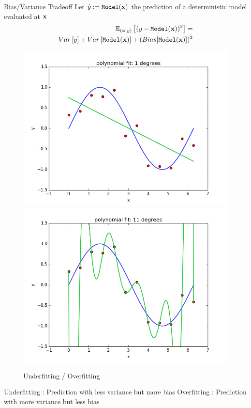 \documentclass[xcolor=pdftex,dvipsnames,table,mathserif]{beamer}
\begin{document}
\begin{frame}{Bias/Variance Tradeoff}
Let $\hat{y}:=\texttt{Model}(\mathbf{x})$ the prediction of a deterministic model evaluated at $\mathbf{x}$
\begin{eqnarray*}
\mathbb{E}_{(\mathbf{x},y)}\left [ (y-\texttt{Model}(\mathbf{x}))^ 2\right ] = \\ Var\left[y \right] + Var \left[ \texttt{Model}(\mathbf{x}) \right] + (Bias [\texttt{Model}(\mathbf{x})])^2
\end{eqnarray*}
\begin{figure}
\includegraphics[width=.45 \columnwidth]{../graphics/polyfit_degree_1}
\includegraphics[width=.45 \columnwidth]{../graphics/polyfit_degree_11}
\caption{Underfitting / Overfitting}
\end{figure}
Underfitting : Prediction with less variance but more bias
Overfitting : Prediction with more variance but less bias
\end{frame}
\end{document}
